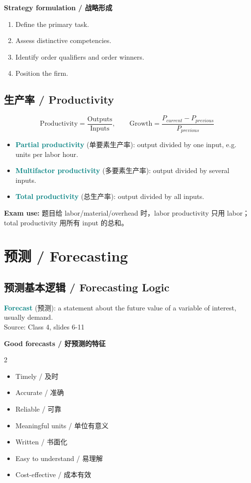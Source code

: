 \documentclass[10pt,a4paper]{ctexart}
\newcommand{\term}[2]{\textbf{\textcolor{Teal}{#1}} \textcolor{Muted}{(#2)}}
\newcommand{\source}[1]{\textcolor{Muted}{\footnotesize Source: #1}}
\newcommand{\exam}[1]{\textcolor{Amber}{\textbf{Exam use:} #1}}
\begin{document}
\textbf{Strategy formulation / 战略形成}
\begin{enumerate}
  \item Define the primary task.
  \item Assess distinctive competencies.
  \item Identify order qualifiers and order winners.
  \item Position the firm.
\end{enumerate}

\subsection{生产率 / Productivity}
\[
\text{Productivity}=\frac{\text{Outputs}}{\text{Inputs}}, \qquad
\text{Growth}=\frac{P_{current}-P_{previous}}{P_{previous}}
\]

\begin{itemize}
  \item \term{Partial productivity}{单要素生产率}: output divided by one input, e.g. units per labor hour.
  \item \term{Multifactor productivity}{多要素生产率}: output divided by several inputs.
  \item \term{Total productivity}{总生产率}: output divided by all inputs.
\end{itemize}
\exam{题目给 labor/material/overhead 时，labor productivity 只用 labor；total productivity 用所有 input 的总和。}

\section{预测 / Forecasting}
\label{sec:forecasting}

\subsection{预测基本逻辑 / Forecasting Logic}
\term{Forecast}{预测}: a statement about the future value of a variable of interest, usually demand.\\
\source{Class 4, slides 6-11}

\textbf{Good forecasts / 好预测的特征}
\begin{multicols}{2}
\begin{itemize}
  \item Timely / 及时
  \item Accurate / 准确
  \item Reliable / 可靠
  \item Meaningful units / 单位有意义
  \item Written / 书面化
  \item Easy to understand / 易理解
  \item Cost-effective / 成本有效
\end{itemize}
\end{multicols}
\end{document}

